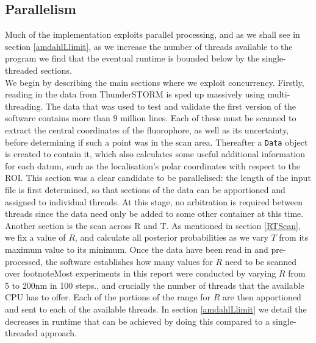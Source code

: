 \documentclass[11pt]{article}
\begin{document}
\subsection{Parallelism}

Much of the implementation exploits parallel processing, and as we shall see in section \ref{amdahlLlimit}, as we increase the number of threads available to the program we find that the eventual runtime is bounded below by the single-threaded sections. \\

We begin by describing the main sections where we exploit concurrency. Firstly, reading in the data from ThunderSTORM is sped up massively using multi-threading. The data that was used to test and validate the first version of the software contains more than 9 million lines. Each of these must be scanned to extract the central coordinates of the fluorophore, as well as its uncertainty, before determining if such a point was in the scan area. Thereafter a \texttt{Data} object is created to contain it, which also calculates some useful additional information for each datum, such as the localisation's polar coordinates with respect to the ROI. This section was a clear candidate to be parallelised: the length of the input file is first determined, so that sections of the data can be apportioned and assigned to individual threads. At this stage, no arbitration is required between threads since the data need only be added to some other container at this time.\\

Another section is the scan across R and T. As mentioned in section \ref{RTScan}, we fix a value of $R$, and calculate all posterior probabilities as we vary $T$ from its maximum value to its minimum. Once the data have been read in and pre-processed, the software establishes how many values for $R$ need to be scanned over footnote{Most experiments in this report were conducted by varying $R$ from 5 to 200nm in 100 steps.}, and crucially the number of threads that the available CPU has to offer. Each of the portions of the range for $R$ are then apportioned and sent to each of the available threads. In section \ref{amdahlLlimit} we detail the decreases in runtime that can be achieved by doing this compared to a single-threaded approach. \\
\end{document}
